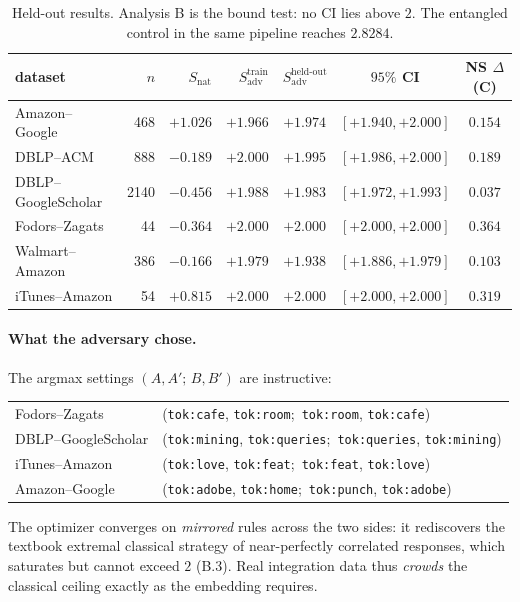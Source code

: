 \documentclass[11pt]{article}
\theoremstyle{definition}
\begin{document}
\begin{table}[h]\centering\small
\caption{Held-out results. Analysis B is the bound test: no CI lies above $2$. The entangled control in the same pipeline reaches $2.8284$.}
\begin{tabular}{lrrrrcc}
\toprule
dataset & $n$ & $S_{\text{nat}}$ & $S_{\text{adv}}^{\text{train}}$ & $S_{\text{adv}}^{\text{held-out}}$ & $95\%$ CI & NS $\Delta$ (C)\\
\midrule
Amazon--Google & 468 & $+1.026$ & $+1.966$ & $+1.974$ & $[+1.940,+2.000]$ & $0.154$\\
DBLP--ACM & 888 & $-0.189$ & $+2.000$ & $+1.995$ & $[+1.986,+2.000]$ & $0.189$\\
DBLP--GoogleScholar & 2140 & $-0.456$ & $+1.988$ & $+1.983$ & $[+1.972,+1.993]$ & $0.037$\\
Fodors--Zagats & 44 & $-0.364$ & $+2.000$ & $+2.000$ & $[+2.000,+2.000]$ & $0.364$\\
Walmart--Amazon & 386 & $-0.166$ & $+1.979$ & $+1.938$ & $[+1.886,+1.979]$ & $0.103$\\
iTunes--Amazon & 54 & $+0.815$ & $+2.000$ & $+2.000$ & $[+2.000,+2.000]$ & $0.319$\\
\bottomrule
\end{tabular}
\end{table}

\paragraph{What the adversary chose.} The argmax settings $(A,A';\,B,B')$ are instructive:

\begin{center}\small
\begin{tabular}{ll}
Fodors--Zagats & (\texttt{tok:cafe}, \texttt{tok:room};\ \texttt{tok:room}, \texttt{tok:cafe})\\
DBLP--GoogleScholar & (\texttt{tok:mining}, \texttt{tok:queries};\ \texttt{tok:queries}, \texttt{tok:mining})\\
iTunes--Amazon & (\texttt{tok:love}, \texttt{tok:feat};\ \texttt{tok:feat}, \texttt{tok:love})\\
Amazon--Google & (\texttt{tok:adobe}, \texttt{tok:home};\ \texttt{tok:punch}, \texttt{tok:adobe})\\
\end{tabular}
\end{center}

\noindent The optimizer converges on \emph{mirrored} rules across the two sides: it rediscovers the textbook extremal classical strategy of near-perfectly correlated responses, which saturates but cannot exceed $2$ (B.3). Real integration data thus \emph{crowds} the classical ceiling exactly as the embedding requires.
\end{document}
